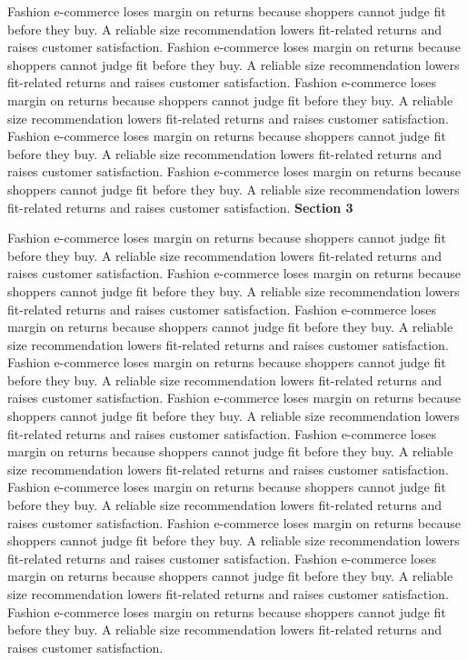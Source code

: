 \documentclass[a4paper,11pt]{article}
\begin{document}
Fashion e-commerce loses margin on returns because shoppers cannot judge fit before they buy. A reliable size recommendation lowers fit-related returns and raises customer satisfaction. Fashion e-commerce loses margin on returns because shoppers cannot judge fit before they buy. A reliable size recommendation lowers fit-related returns and raises customer satisfaction. Fashion e-commerce loses margin on returns because shoppers cannot judge fit before they buy. A reliable size recommendation lowers fit-related returns and raises customer satisfaction. Fashion e-commerce loses margin on returns because shoppers cannot judge fit before they buy. A reliable size recommendation lowers fit-related returns and raises customer satisfaction. Fashion e-commerce loses margin on returns because shoppers cannot judge fit before they buy. A reliable size recommendation lowers fit-related returns and raises customer satisfaction. \newpage
{\headfont\bfseries\Large Section 3}\par\medskip
Fashion e-commerce loses margin on returns because shoppers cannot judge fit before they buy. A reliable size recommendation lowers fit-related returns and raises customer satisfaction. Fashion e-commerce loses margin on returns because shoppers cannot judge fit before they buy. A reliable size recommendation lowers fit-related returns and raises customer satisfaction. Fashion e-commerce loses margin on returns because shoppers cannot judge fit before they buy. A reliable size recommendation lowers fit-related returns and raises customer satisfaction. Fashion e-commerce loses margin on returns because shoppers cannot judge fit before they buy. A reliable size recommendation lowers fit-related returns and raises customer satisfaction. Fashion e-commerce loses margin on returns because shoppers cannot judge fit before they buy. A reliable size recommendation lowers fit-related returns and raises customer satisfaction. 
Fashion e-commerce loses margin on returns because shoppers cannot judge fit before they buy. A reliable size recommendation lowers fit-related returns and raises customer satisfaction. Fashion e-commerce loses margin on returns because shoppers cannot judge fit before they buy. A reliable size recommendation lowers fit-related returns and raises customer satisfaction. Fashion e-commerce loses margin on returns because shoppers cannot judge fit before they buy. A reliable size recommendation lowers fit-related returns and raises customer satisfaction. Fashion e-commerce loses margin on returns because shoppers cannot judge fit before they buy. A reliable size recommendation lowers fit-related returns and raises customer satisfaction. Fashion e-commerce loses margin on returns because shoppers cannot judge fit before they buy. A reliable size recommendation lowers fit-related returns and raises customer satisfaction. \newpage
\end{document}
